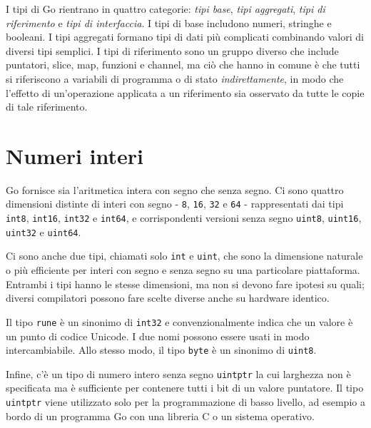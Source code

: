 I tipi di Go rientrano in quattro categorie: \textit{tipi base}, \textit{tipi aggregati}, \textit{tipi di riferimento} e \textit{tipi di interfaccia}.
I tipi di base includono numeri, stringhe e booleani.
I tipi aggregati formano tipi di dati più complicati combinando valori di diversi tipi semplici.
I tipi di riferimento sono un gruppo diverso che include puntatori, slice, map, funzioni e channel, ma ciò che hanno in comune è che tutti si riferiscono a variabili di programma o di stato \textit{indirettamente}, in modo che l'effetto di un'operazione applicata a un riferimento sia osservato da tutte le copie di tale riferimento.


\section{Numeri interi}
\label{sec:numeri_interi}%
Go fornisce sia l'aritmetica intera con segno che senza segno.
Ci sono quattro dimensioni distinte di interi con segno - \verb|8|, \verb|16|, \verb|32| e \verb|64| - rappresentati dai tipi \verb|int8|, \verb|int16|, \verb|int32| e \verb|int64|, e corrispondenti versioni senza segno \verb|uint8|, \verb|uint16|, \verb|uint32| e \verb|uint64|.

Ci sono anche due tipi, chiamati solo \verb|int| e \verb|uint|, che sono la dimensione naturale o più efficiente per interi con segno e senza segno su una particolare piattaforma.
Entrambi i tipi hanno le stesse dimensioni, ma non si devono fare ipotesi su quali;
diversi compilatori possono fare scelte diverse anche su hardware identico.

Il tipo \verb|rune| è un sinonimo di \verb|int32| e convenzionalmente indica che un valore è un punto di codice Unicode.
I due nomi possono essere usati in modo intercambiabile.
Allo stesso modo, il tipo \verb|byte| è un sinonimo di \verb|uint8|.

Infine, c'è un tipo di numero intero senza segno \verb|uintptr| la cui larghezza non è specificata ma è sufficiente per contenere tutti i bit di un valore puntatore.
Il tipo \verb|uintptr| viene utilizzato solo per la programmazione di basso livello, ad esempio a bordo di un programma Go con una libreria C o un sistema operativo.

